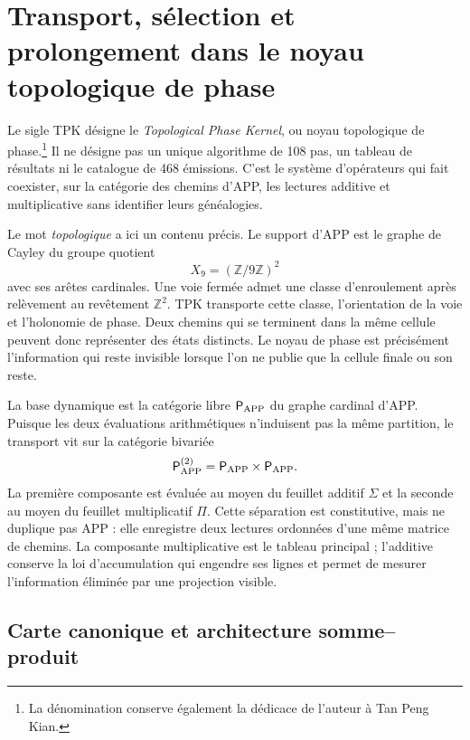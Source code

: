 \chapter{Transport, sélection et prolongement dans le noyau topologique de phase}
\label{sec:arquitectura-tpk}

Le sigle TPK désigne le \emph{Topological Phase Kernel}, ou noyau
topologique de phase.\footnote{La dénomination conserve également la
dédicace de l'auteur à Tan Peng Kian.} Il ne désigne pas un unique algorithme de 108
pas, un tableau de résultats ni le catalogue de 468 émissions. C'est le
système d'opérateurs qui fait coexister, sur la catégorie des chemins
d'APP, les lectures additive et multiplicative sans identifier leurs généalogies.

Le mot \emph{topologique} a ici un contenu précis. Le support
d'APP est le graphe de Cayley du groupe quotient
\[
 X_9=(\mathbb Z/9\mathbb Z)^2
\]
avec ses arêtes cardinales. Une voie fermée admet une classe d'enroulement
après relèvement au revêtement \(\mathbb Z^2\). TPK transporte cette classe,
l'orientation de la voie et l'holonomie de phase. Deux chemins qui se terminent
dans la même cellule peuvent donc représenter des états distincts. Le noyau
de phase est précisément l'information qui reste invisible lorsque l'on ne publie
que la cellule finale ou son reste.

La base dynamique est la catégorie libre \(\mathsf P_{\rm APP}\) du graphe
cardinal d'APP\@. Puisque les deux évaluations arithmétiques n'induisent pas la
même partition, le transport vit sur la catégorie bivariée
\[
 \mathsf P_{\rm APP}^{(2)}
 =\mathsf P_{\rm APP}\times\mathsf P_{\rm APP}.
\]
La première composante est évaluée au moyen du feuillet additif \(\Sigma\) et la
seconde au moyen du feuillet multiplicatif \(\Pi\). Cette séparation est
constitutive, mais ne duplique pas APP : elle enregistre deux lectures ordonnées d'une
même matrice de chemins. La composante multiplicative est le tableau principal ;
l'additive conserve la loi d'accumulation qui engendre ses lignes et permet de
mesurer l'information éliminée par une projection visible.

\ifdefined\HMTTPKRepeatAPP
\section{Carte canonique et architecture somme--produit}


